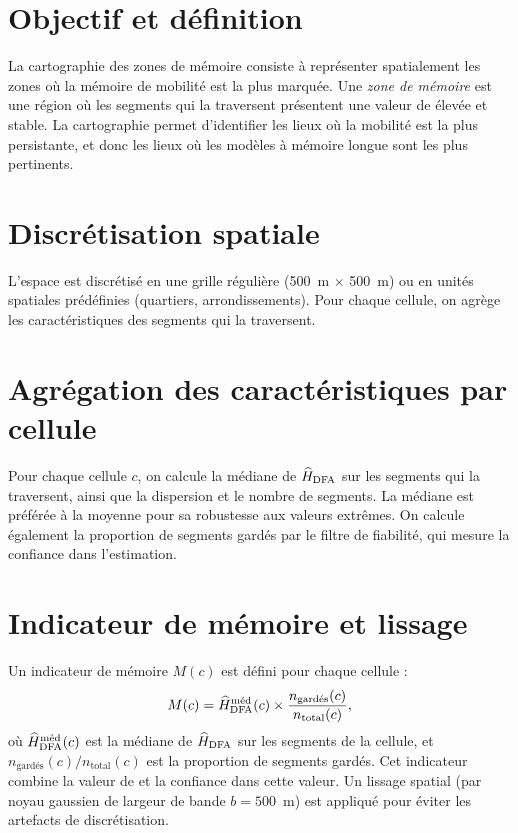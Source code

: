 \section{Objectif et définition}
La cartographie des zones de mémoire consiste à représenter spatialement les zones où la mémoire de mobilité est la plus marquée. Une \emph{zone de mémoire} est une région où les segments qui la traversent présentent une valeur de \Hurst{} élevée et stable. La cartographie permet d'identifier les lieux où la mobilité est la plus persistante, et donc les lieux où les modèles à mémoire longue sont les plus pertinents.

\section{Discrétisation spatiale}
L'espace est discrétisé en une grille régulière (500~m $\times$ 500~m) ou en unités spatiales prédéfinies (quartiers, arrondissements). Pour chaque cellule, on agrège les caractéristiques des segments qui la traversent.

\section{Agrégation des caractéristiques par cellule}
Pour chaque cellule $c$, on calcule la médiane de $\widehat{H}_{\text{DFA}}$ sur les segments qui la traversent, ainsi que la dispersion et le nombre de segments. La médiane est préférée à la moyenne pour sa robustesse aux valeurs extrêmes. On calcule également la proportion de segments gardés par le filtre de fiabilité, qui mesure la confiance dans l'estimation.

\section{Indicateur de mémoire et lissage}
\label{sec:indicateur}
Un indicateur de mémoire $M(c)$ est défini pour chaque cellule :
\begin{equation}
M(c) = \widehat{H}_{\text{DFA}}^{\text{méd}}(c) \times \frac{n_{\text{gardés}}(c)}{n_{\text{total}}(c)},
\end{equation}
où $\widehat{H}_{\text{DFA}}^{\text{méd}}(c)$ est la médiane de $\widehat{H}_{\text{DFA}}$ sur les segments de la cellule, et $n_{\text{gardés}}(c)/n_{\text{total}}(c)$ est la proportion de segments gardés. Cet indicateur combine la valeur de \Hurst{} et la confiance dans cette valeur. Un lissage spatial (par noyau gaussien de largeur de bande $b = 500$~m) est appliqué pour éviter les artefacts de discrétisation.

